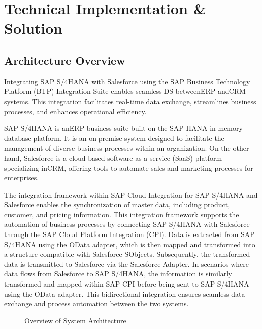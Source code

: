 
\chapter{Technical Implementation \& Solution}
\section{Architecture Overview}

Integrating SAP S/4HANA with Salesforce using the SAP Business Technology Platform (BTP) Integration Suite enables seamless DS betweenERP andCRM systems. This integration facilitates real-time data exchange, streamlines business processes, and enhances operational efficiency.

SAP S/4HANA is anERP business suite built on the SAP HANA in-memory database platform. It is an on-premise system designed to facilitate the management of diverse business processes within an organization. On the other hand, Salesforce is a cloud-based software-as-a-service (SaaS) platform specializing inCRM, offering tools to automate sales and marketing processes for enterprises.

The integration framework within SAP Cloud Integration for SAP S/4HANA and Salesforce enables the synchronization of master data, including product, customer, and pricing information. This integration framework supports the automation of business processes by connecting SAP S/4HANA with Salesforce through the SAP Cloud Platform Integration (CPI). Data is extracted from SAP S/4HANA using the OData adapter, which is then mapped and transformed into a structure compatible with Salesforce SObjects. Subsequently, the transformed data is transmitted to Salesforce via the Salesforce Adapter. In scenarios where data flows from Salesforce to SAP S/4HANA, the information is similarly transformed and mapped within SAP CPI before being sent to SAP S/4HANA using the OData adapter. This bidirectional integration ensures seamless data exchange and process automation between the two systems.


\begin{figure}[H]
    \centering
    \caption{Overview of System Architecture}
    \label{fig:impl}
\end{figure}

